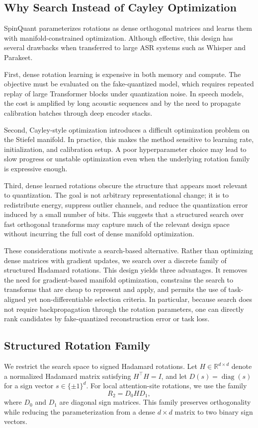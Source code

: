 \documentclass[11pt]{article}
\newcommand{\R}{\mathbb{R}}
\newcommand{\diag}{\operatorname{diag}}
\begin{document}
\subsection{Why Search Instead of Cayley Optimization}
SpinQuant parameterizes rotations as dense orthogonal matrices and learns them with manifold-constrained optimization. Although effective, this design has several drawbacks when transferred to large ASR systems such as Whisper and Parakeet.

First, dense rotation learning is expensive in both memory and compute. The objective must be evaluated on the fake-quantized model, which requires repeated replay of large Transformer blocks under quantization noise. In speech models, the cost is amplified by long acoustic sequences and by the need to propagate calibration batches through deep encoder stacks.

Second, Cayley-style optimization introduces a difficult optimization problem on the Stiefel manifold. In practice, this makes the method sensitive to learning rate, initialization, and calibration setup. A poor hyperparameter choice may lead to slow progress or unstable optimization even when the underlying rotation family is expressive enough.

Third, dense learned rotations obscure the structure that appears most relevant to quantization. The goal is not arbitrary representational change; it is to redistribute energy, suppress outlier channels, and reduce the quantization error induced by a small number of bits. This suggests that a structured search over fast orthogonal transforms may capture much of the relevant design space without incurring the full cost of dense manifold optimization.

These considerations motivate a search-based alternative. Rather than optimizing dense matrices with gradient updates, we search over a discrete family of structured Hadamard rotations. This design yields three advantages. It removes the need for gradient-based manifold optimization, constrains the search to transforms that are cheap to represent and apply, and permits the use of task-aligned yet non-differentiable selection criteria. In particular, because search does not require backpropagation through the rotation parameters, one can directly rank candidates by fake-quantized reconstruction error or task loss.

\subsection{Structured Rotation Family}
We restrict the search space to signed Hadamard rotations. Let $H \in \R^{d \times d}$ denote a normalized Hadamard matrix satisfying $H^\top H = I$, and let $D(s) = \diag(s)$ for a sign vector $s \in \{\pm 1\}^d$. For local attention-site rotations, we use the family
\begin{equation}
R_2 = D_0 H D_1,
\end{equation}
where $D_0$ and $D_1$ are diagonal sign matrices. This family preserves orthogonality while reducing the parameterization from a dense $d \times d$ matrix to two binary sign vectors.
\end{document}
